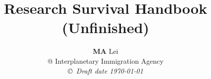 \documentclass[12pt,a4paper]{book}
\begin{document}
\title{Research Survival Handbook \\ (\textbf{Unfinished})}
\author{{\bf MA} Lei  \\
@ Interplanetary Immigration Agency \\
{\small\em \copyright \ Draft date \today}}
\date{}
\maketitle


\newcommand{\dd}{\mathrm d}
\newenvironment{eqnset}
{\begin{equation}\left \bracevert \begin{array}{l}}
{\end{array} \right. \end{equation}}

\newenvironment{eqn}
{\begin{equation}\left \bracevert \begin{array}{l}}
{\end{array} \right. \end{equation}}
\end{document}

